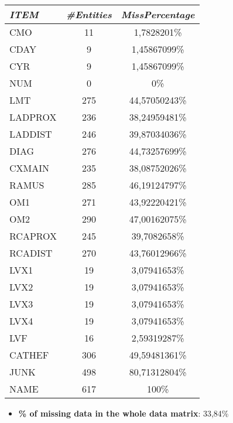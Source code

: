 \documentclass[a4paper,12pt]{article}
\begin{document}
        \begin{multicols}{2}
            
            \begin{tabular}{|l|c|c|} \hline

                \textit{ITEM} & \textit{\#Entities} & \textit{MissPercentage} \\
                \hline CMO  &11&    1,7828201\% \\
                \hline CDAY &9& 1,45867099\% \\
                \hline CYR  &9& 1,45867099\% \\
                \hline NUM  &0& 0\% \\
                \hline LMT  &275&   44,57050243\% \\
                \hline LADPROX& 236&    38,24959481\% \\
                \hline LADDIST& 246&    39,87034036\% \\
                \hline DIAG &276    &44,73257699\% \\
                \hline CXMAIN&  235 &38,08752026\% \\
                \hline RAMUS    &285    &46,19124797\% \\
                \hline OM1  &271    &43,92220421\% \\
                \hline OM2  &290    &47,00162075\% \\
                \hline RCAPROX& 245&    39,7082658\% \\
                \hline RCADIST& 270&    43,76012966\% \\
                \hline LVX1 &19&    3,07941653\% \\
                \hline LVX2 &19 &3,07941653\% \\
                \hline LVX3 &19&    3,07941653\% \\
                \hline LVX4 &19&    3,07941653\% \\
                \hline LVF  &16&    2,59319287\% \\
                \hline CATHEF&  306&    49,59481361\% \\
                \hline JUNK &498    &80,71312804\% \\
                \hline NAME &617    &100\% \\ \hline
                
            \end{tabular}
    \end{multicols}
    
    \begin{itemize}
        \item \textbf{\% of missing data in the whole data matrix}: 33,84\%

    \end{itemize}
    
\end{document}
